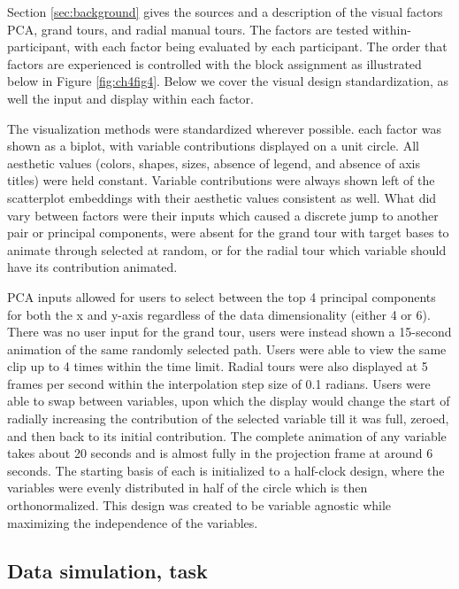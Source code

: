 \documentclass{template/monashthesis}
\begin{document}
Section \ref{sec:background} gives the sources and a description of the visual factors PCA, grand tours, and radial manual tours. The factors are tested within-participant, with each factor being evaluated by each participant. The order that factors are experienced is controlled with the block assignment as illustrated below in Figure \ref{fig:ch4fig4}. Below we cover the visual design standardization, as well the input and display within each factor.

The visualization methods were standardized wherever possible. each factor was shown as a biplot, with variable contributions displayed on a unit circle. All aesthetic values (colors, shapes, sizes, absence of legend, and absence of axis titles) were held constant. Variable contributions were always shown left of the scatterplot embeddings with their aesthetic values consistent as well. What did vary between factors were their inputs which caused a discrete jump to another pair or principal components, were absent for the grand tour with target bases to animate through selected at random, or for the radial tour which variable should have its contribution animated.

PCA inputs allowed for users to select between the top 4 principal components for both the x and y-axis regardless of the data dimensionality (either 4 or 6). There was no user input for the grand tour, users were instead shown a 15-second animation of the same randomly selected path. Users were able to view the same clip up to 4 times within the time limit. Radial tours were also displayed at 5 frames per second within the interpolation step size of 0.1 radians. Users were able to swap between variables, upon which the display would change the start of radially increasing the contribution of the selected variable till it was full, zeroed, and then back to its initial contribution. The complete animation of any variable takes about 20 seconds and is almost fully in the projection frame at around 6 seconds. The starting basis of each is initialized to a half-clock design, where the variables were evenly distributed in half of the circle which is then orthonormalized. This design was created to be variable agnostic while maximizing the independence of the variables.

\hypertarget{data-simulation-task}{%
\subsection{Data simulation, task}\label{data-simulation-task}}
\end{document}
